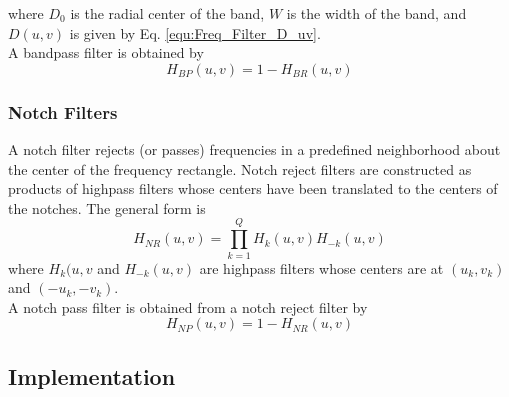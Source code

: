 where $D_0$ is the radial center of the band, $W$ is the width of the band, and $D(u,v)$ is given by Eq. \ref{equ:Freq_Filter_D_uv}. \\

A bandpass filter is obtained by
\begin{equation}
	H_{BP}(u,v) = 1 - H_{BR}(u,v)
\end{equation}

\subsubsection{Notch Filters}  \label{subsubsec:FilteringFrequency_NotchFilters}
A notch filter rejects (or passes) frequencies in a predefined neighborhood about the center of the frequency rectangle. Notch reject filters are constructed as products of highpass filters whose centers have been translated to the centers of the notches. The general form is
\begin{equation}
	H_{NR}(u,v) = \prod_{k=1}^{Q} H_k(u,v) H_{-k}(u,v)
\end{equation}
where $H_k(u,v$ and $H_{-k}(u,v)$ are highpass filters whose centers are at $(u_k,v_k)$ and $(-u_k,-v_k)$. \\

A notch pass filter is obtained from a notch reject filter by
\begin{equation}
	H_{NP}(u,v) = 1 - H_{NR}(u,v)
\end{equation}

\subsection{Implementation }